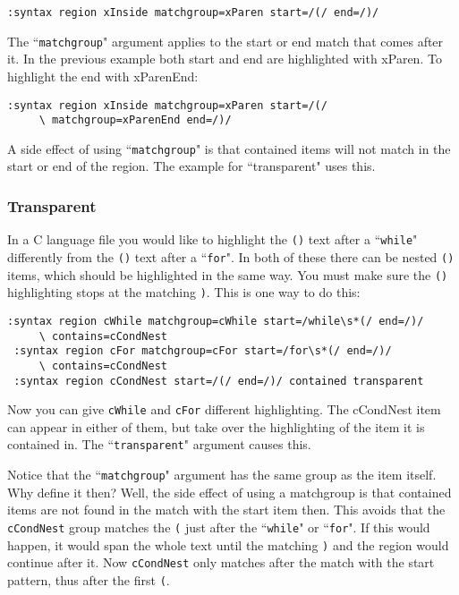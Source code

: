 \begin{Verbatim}[samepage=true]
 :syntax region xInside matchgroup=xParen start=/(/ end=/)/
\end{Verbatim}

The ``\texttt{matchgroup}" argument applies to the start or end match that comes after it.
In the previous example both start and end are highlighted with xParen.
To highlight the end with xParenEnd:

\begin{Verbatim}[samepage=true]
 :syntax region xInside matchgroup=xParen start=/(/
     \ matchgroup=xParenEnd end=/)/
\end{Verbatim}

A side effect of using ``\texttt{matchgroup}" is that contained items will not match in the start or end of the region.
The example for ``transparent" uses this.

\subsubsection{Transparent}
In a C language file you would like to highlight the \texttt{()} text after a ``\texttt{while}" differently from the \texttt{()} text after a ``\texttt{for}".
In both of these there can be nested \texttt{()} items, which should be highlighted in the same way.
You must make sure the \texttt{()} highlighting stops at the matching \texttt{)}.
This is one way to do this:

\begin{Verbatim}[samepage=true]
 :syntax region cWhile matchgroup=cWhile start=/while\s*(/ end=/)/
     \ contains=cCondNest
 :syntax region cFor matchgroup=cFor start=/for\s*(/ end=/)/
     \ contains=cCondNest
 :syntax region cCondNest start=/(/ end=/)/ contained transparent
\end{Verbatim}

Now you can give \texttt{cWhile} and \texttt{cFor} different highlighting.
The cCondNest item can appear in either of them, but take over the highlighting of the item it is contained in.
The ``\texttt{transparent}" argument causes this.

Notice that the ``\texttt{matchgroup}" argument has the same group as the item itself.
Why define it then?  Well, the side effect of using a matchgroup is that contained items are not found in the match with the start item then.
This avoids that the \texttt{cCondNest} group matches the \texttt{(} just after the ``\texttt{while}" or ``\texttt{for}".
If this would happen, it would span the whole text until the matching \texttt{)} and the region would continue after it.
Now \texttt{cCondNest} only matches after the match with the start pattern, thus after the first \texttt{(}.

